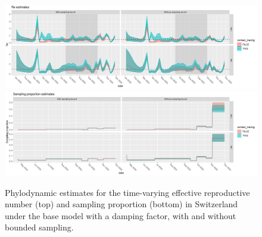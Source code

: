 \documentclass[9pt,twoside,lineno]{pnas-new}
\begin{document}
\begin{figure}[tbhp]
\centering
\includegraphics[width=\linewidth]{figures/bdsky_2021-08-18/Re_CHE_1deme.pdf}
\vfill
\includegraphics[width = \linewidth]{figures/bdsky_2021-08-18/sampProp_CHE_1deme.pdf}
\caption{Phylodynamic estimates for the time-varying effective reproductive number (top) and sampling proportion (bottom) in Switzerland under the base model with a damping factor, with and without bounded sampling.}  
\label{fig:1DemeCHResults}
\end{figure}
\end{document}
